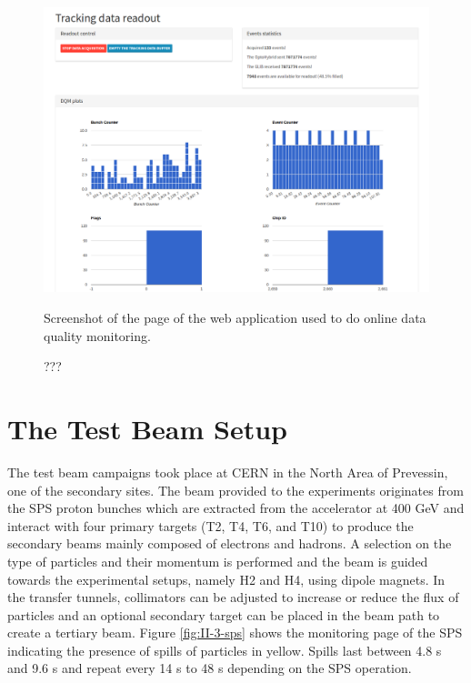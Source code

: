       \begin{figure}[h!]
        \centering
        \includegraphics[width=\textwidth]{img/II-3-test-beam/app-tk.png}
        \caption{Screenshot of the page of the web application used to do online data quality monitoring.}
        \caption{???}
        \label{fig:II-3-app-tk}
      \end{figure}

  \section{The Test Beam Setup}

    The test beam campaigns took place at CERN in the North Area of Prevessin, one of the secondary sites. The beam provided to the experiments originates from the SPS proton bunches which are extracted from the accelerator at 400 GeV and interact with four primary targets (T2, T4, T6, and T10) to produce the secondary beams mainly composed of electrons and hadrons. A selection on the type of particles and their momentum is performed and the beam is guided towards the experimental setups, namely H2 and H4, using dipole magnets. In the transfer tunnels, collimators can be adjusted to increase or reduce the flux of particles and an optional secondary target can be placed in the beam path to create a tertiary beam. Figure \ref{fig:II-3-sps} shows the monitoring page of the SPS indicating the presence of spills of particles in yellow. Spills last between 4.8 s and 9.6 s and repeat every 14 s to 48 s depending on the SPS operation. \\

